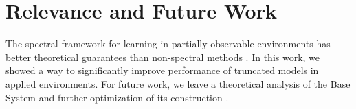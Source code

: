 \documentclass{acm_proc_article-sp}
\begin{document}
\section{Relevance and Future Work}
The spectral framework for learning in partially observable environments has better theoretical guarantees than non-spectral methods \cite{balle2013spectral}. In this work, we showed a way to significantly improve performance of truncated models in applied environments. For future work, we leave a theoretical analysis of the Base System and further optimization of its construction .

%

%
\end{document}
